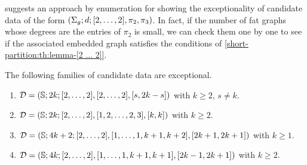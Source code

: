  suggests an approach by enumeration for showing the exceptionality of candidate data of the form $(\Sigma_{g};d;[2,\ldots,2],\pi_2,\pi_3)$. In fact, if the number of fat graphs whose degrees are the entries of $\pi_2$ is small, we can check them one by one to see if the associated embedded graph satisfies the conditions of \cref{short-partition:th:lemma-[2 ... 2]}.

\begin{proposition}\label{short-partition:th:exceptional-sphere}
The following families of candidate data are exceptional.
\begin{enumerate}[(1)]
\item $\mathcal{D}=(\mathbb{S}{};2k;[2,\ldots,2],[2,\ldots,2],[s,2k-s])$ with $k\ge 2$, $s\neq k$.
\item $\mathcal{D}=(\mathbb{S}{};2k;[2,\ldots,2],[1,2,\ldots,2,3],[k,k])$ with $k\ge2$.
\item $\mathcal{D}=(\mathbb{S}{};4k+2;[2,\ldots,2],[1,\ldots,1,k+1,k+2],[2k+1,2k+1])$ with $k\ge 1$.
\item $\mathcal{D}=(\mathbb{S}{};4k;[2,\ldots,2],[1,\ldots,1,k+1,k+1],[2k-1,2k+1])$ with $k\ge2$.
\end{enumerate}
\end{proposition}
